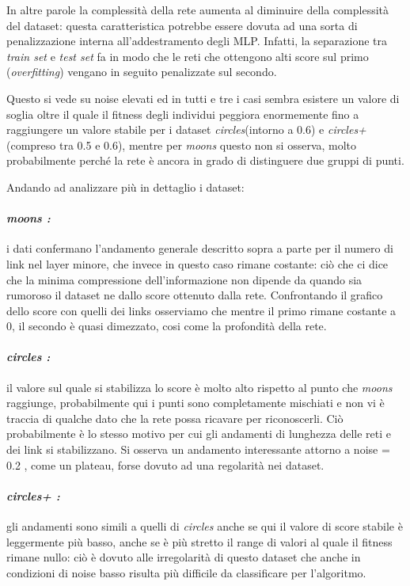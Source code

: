 \documentclass[12pt,a4paper]{report}
\begin{document}
In altre parole la complessità della rete aumenta al diminuire della complessità del dataset: questa caratteristica potrebbe essere dovuta ad una sorta di penalizzazione interna all'addestramento degli MLP.
Infatti, la separazione tra \textit{train set} e \textit{test set} fa in modo che le reti che ottengono alti score sul primo (\textit{overfitting}) vengano in seguito penalizzate sul secondo.

Questo si vede su noise elevati ed in tutti e tre i casi sembra esistere un valore di soglia oltre il quale il fitness degli individui peggiora enormemente fino a raggiungere un valore stabile per i dataset \textit{circles}(intorno a 0.6) e \textit{circles+} (compreso tra 0.5 e 0.6), mentre per \textit{moons} questo non si osserva, molto probabilmente perché la rete è ancora in grado di distinguere due gruppi di punti.

Andando ad analizzare più in dettaglio i dataset:

\paragraph{\textit{moons :}} i dati confermano l'andamento generale descritto sopra a parte per il numero di link nel layer minore, che invece in questo caso rimane costante: ciò che ci dice che la minima compressione dell'informazione non dipende da quando sia rumoroso il dataset ne dallo score ottenuto dalla rete.
Confrontando il grafico dello score con quelli dei links osserviamo che mentre il primo rimane costante a 0, il secondo è quasi dimezzato, cosi come la profondità della rete. 
\paragraph{\textit{circles :}} il valore sul quale si stabilizza lo score è molto alto rispetto al punto che \textit{moons} raggiunge, probabilmente qui i punti sono completamente mischiati e non vi è traccia di qualche dato che la rete possa ricavare per riconoscerli. Ciò probabilmente è lo stesso motivo per cui gli andamenti di lunghezza delle reti e dei link si stabilizzano. Si osserva un andamento interessante attorno a noise = 0.2 , come un plateau, forse dovuto ad una regolarità nei dataset.
\paragraph{\textit{circles+ :}} gli andamenti sono simili a quelli di \textit{circles} anche se qui il valore di score stabile è leggermente più basso, anche se è più stretto il range di valori al quale il fitness rimane nullo: ciò è dovuto alle irregolarità di questo dataset che anche in condizioni di noise basso risulta più difficile da classificare per l'algoritmo.
\end{document}
